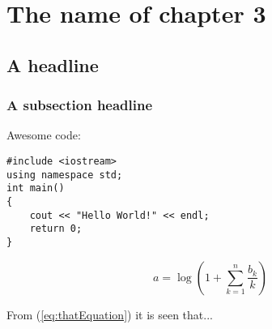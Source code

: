
\chapter{The name of chapter 3} %

\label{Chapter3} %



\section{A headline}



\subsection{A subsection headline}

Awesome code:
\begin{verbatim}
#include <iostream>
using namespace std;
int main()
{ 
    cout << "Hello World!" << endl; 
    return 0;
}
\end{verbatim}


\begin{equation}
a = \log \left( 1 + \sum_{k=1}^n \frac{b_k}{k} \right)
\label{eq:thatEquation}
\end{equation}


From (\ref{eq:thatEquation}) it is seen that...